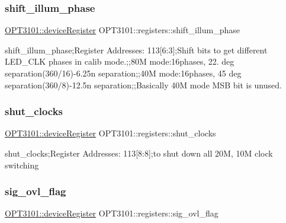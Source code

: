 \subsubsection{\texorpdfstring{shift\+\_\+illum\+\_\+phase}{shift\_illum\_phase}}
{\footnotesize\ttfamily \mbox{\hyperlink{class_o_p_t3101_1_1device_register}{O\+P\+T3101\+::device\+Register}} O\+P\+T3101\+::registers\+::shift\+\_\+illum\+\_\+phase}



shift\+\_\+illum\+\_\+phase;Register Addresses\+: 113\mbox{[}6\+:3\mbox{]};Shift bits to get different L\+E\+D\+\_\+\+C\+LK phases in calib mode.;;80M mode\+:16phases, 22. deg separation(360/16)-\/6.\+25n separation;;40M mode\+:16phases, 45 deg separation(360/8)-\/12.\+5n separation;;Basically 40M mode M\+SB bit is unused. 

\mbox{\label{class_o_p_t3101_1_1registers_ac3c618465f11b7742d57a755528163f6}} 
\subsubsection{\texorpdfstring{shut\+\_\+clocks}{shut\_clocks}}
{\footnotesize\ttfamily \mbox{\hyperlink{class_o_p_t3101_1_1device_register}{O\+P\+T3101\+::device\+Register}} O\+P\+T3101\+::registers\+::shut\+\_\+clocks}



shut\+\_\+clocks;Register Addresses\+: 113\mbox{[}8\+:8\mbox{]};to shut down all 20M, 10M clock switching 

\mbox{\label{class_o_p_t3101_1_1registers_ad767a496a0cad5741d575a54a095add3}} 
\subsubsection{\texorpdfstring{sig\+\_\+ovl\+\_\+flag}{sig\_ovl\_flag}}
{\footnotesize\ttfamily \mbox{\hyperlink{class_o_p_t3101_1_1device_register}{O\+P\+T3101\+::device\+Register}} O\+P\+T3101\+::registers\+::sig\+\_\+ovl\+\_\+flag}



